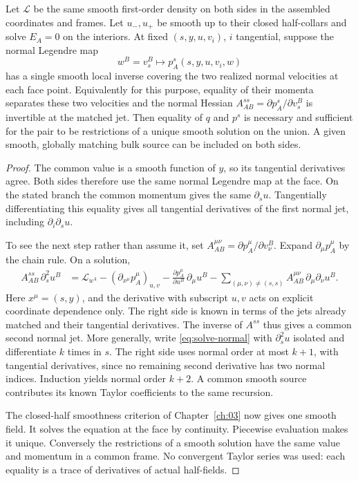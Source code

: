 \begin{theorem}\label{thm:branch}
Let $\mathcal L$ be the same smooth first-order density on both sides in the assembled coordinates and frames. Let $u_-,u_+$ be smooth up to their closed half-collars and solve $E_A=0$ on the interiors. At fixed $(s,y,u,v_i)$, $i$ tangential, suppose the normal Legendre map
\[
 w^B=v_s^B\longmapsto p_A^s(s,y,u,v_i,w)
\]
has a single smooth local inverse covering the two realized normal velocities at each face point. Equivalently for this purpose, equality of their momenta separates these two velocities and the normal Hessian $A^{ss}_{AB}=\partial p_A^s/\partial v_s^B$ is invertible at the matched jet. Then equality of $q$ and $p^s$ is necessary and sufficient for the pair to be restrictions of a unique smooth solution on the union. A given smooth, globally matching bulk source can be included on both sides.
\end{theorem}
\begin{proof}
The common value is a smooth function of $y$, so its tangential derivatives agree. Both sides therefore use the same normal Legendre map at the face. On the stated branch the common momentum gives the same $\partial_s u$. Tangentially differentiating this equality gives all tangential derivatives of the first normal jet, including $\partial_i\partial_s u$.

To see the next step rather than assume it, set $A^{\mu\nu}_{AB}=\partial p_A^\mu/\partial v_\nu^B$. Expand $\partial_\mu p_A^\mu$ by the chain rule. On a solution,
\begin{align}
 A^{ss}_{AB}\,\partial_s^2 u^B
   &=\mathcal L_{u^A}-(\partial_{x^\mu}p_A^\mu)_{u,v}
       -\frac{\partial p_A^\mu}{\partial u^B}\,\partial_\mu u^B
       -\sum_{(\mu,\nu)\ne(s,s)}A^{\mu\nu}_{AB}\,\partial_\mu\partial_\nu u^B .\label{eq:solve-normal}
\end{align}
Here $x^\mu=(s,y)$, and the derivative with subscript $u,v$ acts on explicit coordinate dependence only. The right side is known in terms of the jets already matched and their tangential derivatives. The inverse of $A^{ss}$ thus gives a common second normal jet. More generally, write \eqref{eq:solve-normal} with $\partial_s^2u$ isolated and differentiate $k$ times in $s$. The right side uses normal order at most $k+1$, with tangential derivatives, since no remaining second derivative has two normal indices. Induction yields normal order $k+2$. A common smooth source contributes its known Taylor coefficients to the same recursion.

The closed-half smoothness criterion of Chapter~\ref{ch:03} now gives one smooth field. It solves the equation at the face by continuity. Piecewise evaluation makes it unique. Conversely the restrictions of a smooth solution have the same value and momentum in a common frame. No convergent Taylor series was used: each equality is a trace of derivatives of actual half-fields.
\end{proof}

